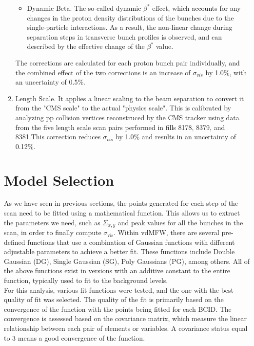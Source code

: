 \begin{enumerate}
\begin{itemize}
\item Dynamic Beta. The so-called dynamic $\beta^{*}$  effect, which accounts for any changes in the proton density distributions of the bunches due to the single-particle interactions. As a result, the non-linear change during separation steps in transverse bunch profiles is observed, and can described by the effective change of the $\beta^{*}$   value.
\end{itemize}
The corrections are calculated for each proton bunch pair individually, and the combined effect of the two corrections is an increase of $\sigma_{vis}$ by 1.0\%, with an uncertainty of 0.5\%.

\item Length Scale.  It applies a linear scaling to the beam separation to convert it from the "CMS scale" to the actual "physics scale". This is  calibrated by analyzing pp collision vertices reconstruced by the CMS tracker using data from the five length scale scan pairs performed in fills 8178, 8379, and 8381.This correction reduces $\sigma_{vis}$ by 1.0\% and results in an uncertainty of 0.12\%.

\end{enumerate}

\section{Model  Selection}

As we have seen in previous sections, the points generated for each step of the scan need to be fitted using a mathematical function. This allows us to extract the parameters we need, such as $\Sigma_{x,y}$ and peak values for all the bunches in the scan, in order to finally compute $\sigma_{\text{vis}}$. Within vdMFW, there are several pre-defined functions that use a combination of Gaussian functions with different adjustable parameters to achieve a better fit. These functions include Double Gaussian (DG), Single Gaussian (SG), Poly Gaussians (PG), among others. All of the above functions exist in versions with an additive constant to the entire function, typically used to fit to the background levels.\\

For this analysis, various fit functions were tested, and the one with the best quality of fit was selected. The quality of the fit is primarily based on the convergence of the function with the points being fitted for each BCID. The convergence is assessed based on the covariance matrix, which measure the linear relationship between each pair of elements or variables. A  covariance status equal to 3 means a good convergence of the function.\\ 

